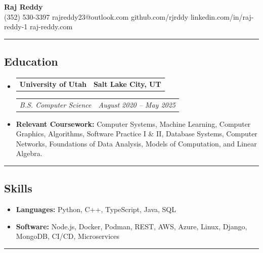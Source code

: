 \documentclass[11pt,letterpaper]{article}
\makeatletter
\newcommand{\headerrow}[2]
{\begin{tabular*}{\linewidth}{l@{\extracolsep{\fill}}r}
#1 &
#2 \\
\end{tabular*}}
\makeatother
\begin{document}
\begin{center}
	{\LARGE \textbf{Raj Reddy}}\\
	\vspace{0.05cm}
	(352) 530-3397
    \hfill rajreddy23@outlook.com
    \hfill github.com/rjrddy
    \hfill linkedin.com/in/raj-reddy-1
    \hfill raj-reddy.com
\end{center}
\hrule
{}

\vspace{-1em}
\subsection*{\Large Education}
\renewcommand\labelitemi{}
\begin{itemize}[leftmargin=1em]
	\parskip=0.1em
	\item
	      \headerrow
	      {\textbf{University of Utah}}
	      {\textbf{Salt Lake City, UT}}
	      \headerrow
	      {\emph{B.S. Computer Science}}
	      {\emph{August 2020 -- May 2025}}
	      \item \textbf{Relevant Coursework:} Computer Systems, Machine Learning, Computer Graphics, Algorithms, Software Practice I \& II, Database Systems, Computer Networks, Foundations of Data Analysis, Models of Computation, and Linear Algebra.
\end{itemize}
\hrule
{}

\vspace{-1em}
\subsection*{\Large Skills}
\begin{itemize}[leftmargin=1em]
    \parskip=0.1em
	\item \textbf{Languages:} Python, C++, TypeScript, Java, SQL
	\item \textbf{Software:} Node.js, Docker, Podman, REST, AWS, Azure, Linux, Django, MongoDB, CI/CD, Microservices
\end{itemize}
\hrule
{}

\vspace{-1em}
\end{document}
